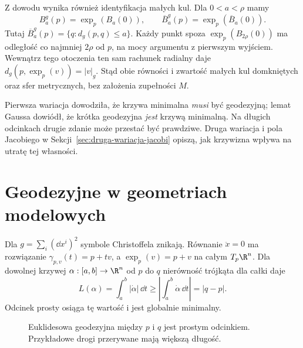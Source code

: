 Z dowodu wynika również identyfikacja małych kul. Dla
$0<a<\rho$ mamy
\begin{equation}\label{eq:male-kule-normalne}
 B^g_a(p)=\exp_p(B_a(0)),\qquad
 \overline B^g_a(p)=\exp_p(\overline B_a(0)).
\end{equation}
Tutaj $\overline B^g_a(p)=\{q:d_g(p,q)\leq a\}$.
Każdy punkt spoza $\exp_p(B_{2\rho}(0))$ ma odległość
co najmniej $2\rho$ od $p$, na mocy argumentu z pierwszym
wyjściem. Wewnątrz tego otoczenia ten sam rachunek
radialny daje $d_g(p,\exp_p(v))=|v|_g$.
Stąd obie równości i zwartość małych kul domkniętych
oraz sfer metrycznych, bez założenia zupełności $M$.

Pierwsza wariacja dowodziła, że krzywa minimalna
\emph{musi} być geodezyjną; lemat Gaussa dowiódł,
że krótka geodezyjna \emph{jest} krzywą minimalną.
Na długich odcinkach drugie zdanie może
przestać być prawdziwe. Druga wariacja i pola
Jacobiego w Sekcji~\ref{sec:druga-wariacja-jacobi}
opiszą, jak krzywizna wpływa na utratę tej własności.

\section{Geodezyjne w geometriach modelowych}
\label{sec:geodezyjne-modele}

\begin{przyklad}
\label{prz:geodezyjne-euklidesowe}
Dla $g=\sum_i(\dd x^i)^2$ symbole Christoffela
znikają. Równanie $\ddot x=0$ ma rozwiązanie
$\gamma_{p,v}(t)=p+tv$, a $\exp_p(v)=p+v$
na całym $T_p\R^n$. Dla dowolnej krzywej
$\alpha:[a,b]\to\R^n$ od $p$ do $q$
nierówność trójkąta dla całki daje
\[
 L(\alpha)=\int_a^b|\dot\alpha|\,\dd t
 \geq\left|\int_a^b\dot\alpha\,\dd t\right|
 =|q-p|.
\]
Odcinek prosty osiąga tę wartość i jest
globalnie minimalny.
\end{przyklad}

\begin{figure}[htbp]
\centering
{}
\caption{Euklidesowa geodezyjna między $p$ i $q$ jest prostym odcinkiem. Przykładowe drogi przerywane mają większą długość.}
\label{fig:geodezyjna-euklidesowa}
\end{figure}

